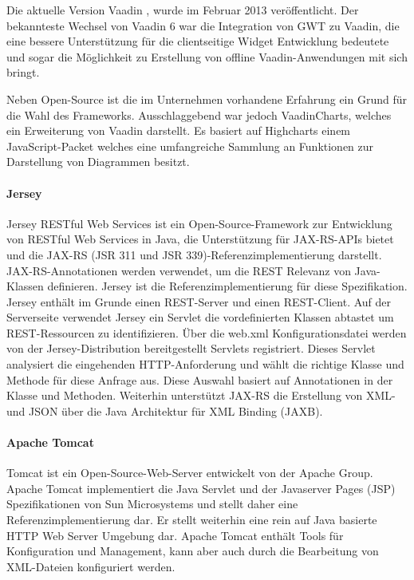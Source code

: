Die aktuelle Version Vaadin , wurde im Februar 2013 veröffentlicht. Der bekannteste Wechsel von Vaadin 6 war die Integration von GWT zu Vaadin, die eine bessere Unterstützung für die clientseitige Widget Entwicklung bedeutete und sogar die Möglichkeit zu Erstellung von offline Vaadin-Anwendungen mit sich bringt.

Neben Open-Source ist die im Unternehmen vorhandene Erfahrung ein Grund für die Wahl des Frameworks. Ausschlaggebend war jedoch VaadinCharts, welches ein Erweiterung von Vaadin darstellt. Es basiert auf Highcharts einem JavaScript-Packet welches eine umfangreiche Sammlung an Funktionen zur Darstellung von Diagrammen besitzt. 

\paragraph{Jersey}

Jersey RESTful Web Services ist ein Open-Source-Framework zur Entwicklung von RESTful Web Services in Java, die Unterstützung für JAX-RS-APIs bietet und die JAX-RS (JSR 311 und JSR 339)-Referenzimplementierung darstellt. JAX-RS-Annotationen werden verwendet, um die REST Relevanz von Java-Klassen definieren. Jersey ist die Referenzimplementierung für diese Spezifikation. Jersey enthält im Grunde einen REST-Server und einen REST-Client. Auf der Serverseite verwendet Jersey ein Servlet die vordefinierten Klassen abtastet um REST-Ressourcen zu identifizieren. Über die web.xml Konfigurationsdatei werden von der Jersey-Distribution bereitgestellt Servlets registriert. Dieses Servlet analysiert die eingehenden HTTP-Anforderung und wählt die richtige Klasse und Methode für diese Anfrage aus. Diese Auswahl basiert auf Annotationen in der Klasse und Methoden. Weiterhin unterstützt JAX-RS die Erstellung von XML-und JSON über die Java Architektur für XML Binding (JAXB).

\paragraph{Apache Tomcat}

Tomcat ist ein Open-Source-Web-Server entwickelt von der Apache Group. Apache Tomcat implementiert die Java Servlet und der Javaserver Pages (JSP) Spezifikationen von Sun Microsystems und stellt daher eine Referenzimplementierung dar. Er stellt weiterhin eine rein auf Java basierte HTTP Web Server Umgebung dar. Apache Tomcat enthält Tools für Konfiguration und Management, kann aber auch durch die Bearbeitung von XML-Dateien konfiguriert werden.

